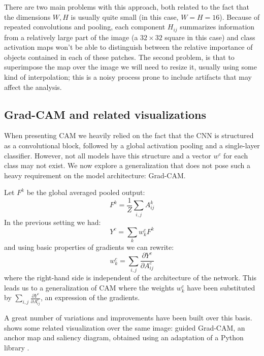 There are two main problems with this approach, both related to the fact that the dimensions \( W, H \) is usually quite small (in this case, \( W = H = 16 \)). Because of repeated convolutions and pooling, each component \( H_{ij} \) summarizes information from a relatively large part of the image (a \( 32 \times 32 \) square in this case) and class activation maps won't be able to distinguish between the relative importance of objects contained in each of these patches. The second problem, is that to superimpose the map over the image we will need to resize it, usually using some kind of interpolation; this is a noisy process prone to include artifacts that may affect the analysis.

\subsection{Grad-CAM and related visualizations}
When presenting CAM we heavily relied on the fact that the CNN is structured as a convolutional block, followed by a global activation pooling and a single-layer classifier. However, not all models have this structure and a vector \( w^c \) for each class may not exist. We now explore a generalization that does not pose such a heavy requirement on the model architecture: Grad-CAM.

Let \( F^k \) be the global averaged pooled output:
\[
    F^k = \frac{1}{Z} \sum_{i, j} A^k_{ij}
\]
In the previous setting we had:
\[
    Y^c = \sum_k w_k^c F^k
\]
and using basic properties of gradients we can rewrite:
\[
    w_k^c = \sum_{i,j} \frac{\partial Y^c}{\partial A_{ij}^c}
\]
where the right-hand side is independent of the architecture of the network. This leads us to a generalization of CAM where the weights \( w_k^c \) have been substituted by \( \sum_{i,j} \frac{\partial Y^c}{\partial A_{ij}^c} \), an expression of the gradients.

A great number of variations and improvements have been built over this basis.  shows some related visualization over the same image: guided Grad-CAM, an anchor map and saliency diagram, obtained using an adaptation of a Python library \cite{journeyvisualization}.

